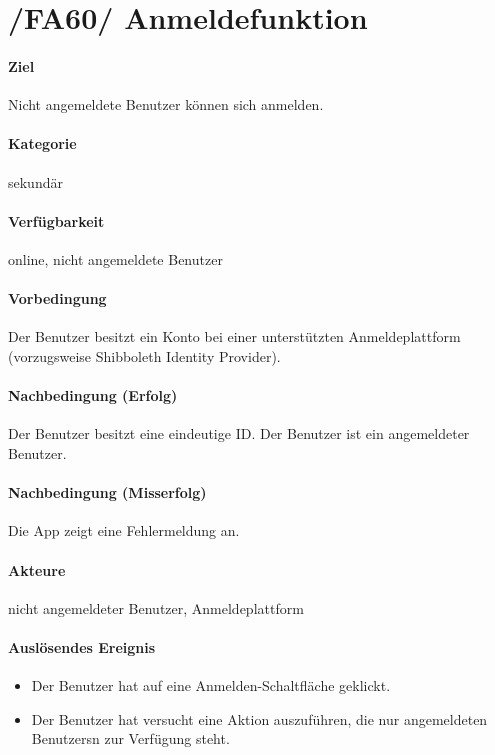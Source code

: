 \section[Anmeldefunktion]{/FA60/ Anmeldefunktion}
\label{Anmeldefunktion}
\label{/FA60/}
\paragraph{Ziel}
Nicht angemeldete \Gls{Benutzer} können sich anmelden.
\paragraph{Kategorie}
sekundär
\paragraph{Verfügbarkeit}
online, nicht angemeldete Benutzer
\paragraph{Vorbedingung}
Der \Gls{Benutzer} besitzt ein Konto bei einer unterstützten Anmeldeplattform (vorzugsweise Shibboleth Identity Provider).
\paragraph{Nachbedingung (Erfolg)}
Der \Gls{Benutzer} besitzt eine eindeutige \Gls{ID}. Der \Gls{Benutzer} ist ein \dq angemeldeter \Gls{Benutzer}\dq{}.
\paragraph{Nachbedingung (Misserfolg)}
Die App zeigt eine Fehlermeldung an.
\paragraph{Akteure}
nicht angemeldeter \Gls{Benutzer}, Anmeldeplattform
\paragraph{Auslösendes Ereignis}
\begin{itemize}
      \item Der \Gls{Benutzer} hat auf eine \dq Anmelden\dq{}-Schaltfläche geklickt.
      \item Der \Gls{Benutzer} hat versucht eine Aktion auszuführen, die nur angemeldeten \Glspl{Benutzer}n zur Verfügung steht.
\end{itemize}
